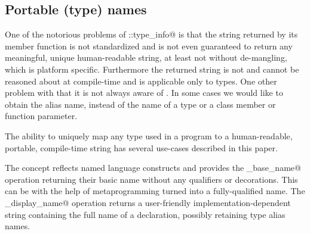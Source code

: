 \subsection{Portable (type) names}

One of the notorious problems of \verb@std::type_info@ is that the string
returned by its \verb@name@ member function is not standardized and is
not even guaranteed to return any meaningful, unique human-readable string,
at least not without de-mangling, which is platform specific.
Furthermore the returned string is not \verb@constexpr@ and cannot be
reasoned about at compile-time and is applicable only to types.
One other problem with \verb@typeid@ that it is not always aware of \verb@typedef@s.
In some cases we would like to obtain the alias name, instead of the
 name of a type or a class member or function parameter.

The ability to uniquely map any type used in a program to a human-readable,
portable, compile-time string has several use-cases described in this paper.

The  concept reflects named language constructs
and provides the \verb@get_base_name@ operation
returning their basic name without any qualifiers or decorations.
This can be with the help of metaprogramming turned into a fully-qualified
name. The \verb@get_display_name@ operation returns a user-friendly
implementation-dependent string containing the full name of a declaration,
possibly retaining type alias names.

